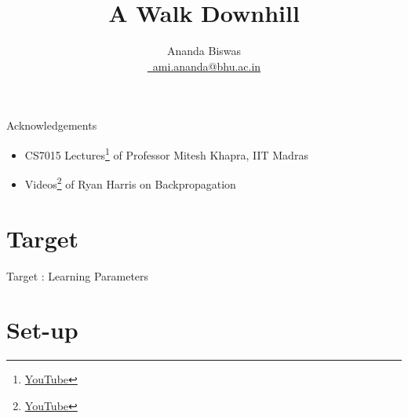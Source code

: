 \documentclass[10pt, aspectratio=169]{beamer}
\title{A Walk Downhill}
\author[Ananda Biswas]{Ananda Biswas \\[0.5em] \href{mailto:ami.ananda@bhu.ac.in}{\faEnvelope \, ami.ananda@bhu.ac.in}}
\date{}
\begin{document}
\begin{frame}
	\titlepage
\end{frame}



\begin{frame}
	\begin{block}{Acknowledgements}
		\begin{itemize}
		\item CS7015 Lectures\footnote{\href{https://www.youtube.com/playlist?list=PLyqSpQzTE6M9gCgajvQbc68Hk_JKGBAYT}{YouTube}} of Professor Mitesh Khapra, IIT Madras \\[0.75em]
		\item Videos\footnote{\href{https://www.youtube.com/playlist?list=PLEAYkSg4uSQ2WG11drrwV6Igj360RaxK9}{YouTube}} of Ryan Harris on Backpropagation
		\end{itemize}			
	\end{block}
\end{frame}


\section{Target}

\begin{frame}{Target : Learning Parameters}
\centering
{}
\end{frame}


\section{Set-up}
\end{document}
